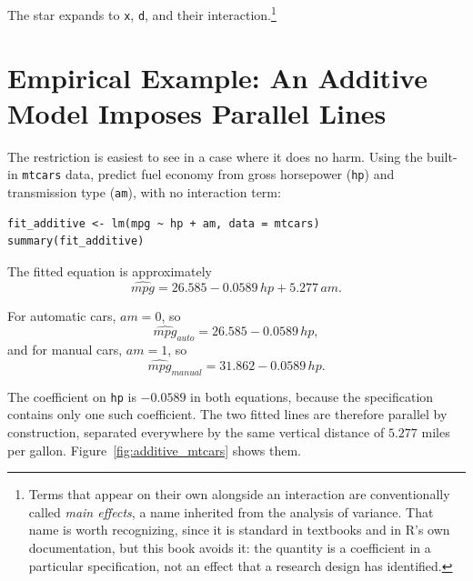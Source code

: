 \documentclass[11pt]{report}
\begin{document}
The star expands to \texttt{x}, \texttt{d}, and their interaction.\footnote{Terms that appear on their own alongside an interaction are conventionally called \emph{main effects}, a name inherited from the analysis of variance. That name is worth recognizing, since it is standard in textbooks and in R's own documentation, but this book avoids it: the quantity is a coefficient in a particular specification, not an effect that a research design has identified.}

\section{Empirical Example: An Additive Model Imposes Parallel Lines}

The restriction is easiest to see in a case where it does no harm. Using the built-in \texttt{mtcars} data, predict fuel economy from gross horsepower (\texttt{hp}) and transmission type (\texttt{am}), with no interaction term:

\begin{lstlisting}
fit_additive <- lm(mpg ~ hp + am, data = mtcars)
summary(fit_additive)
\end{lstlisting}

The fitted equation is approximately
\[
\widehat{mpg}
=
26.585
-0.0589\,hp
+5.277\,am.
\]

For automatic cars, \(am=0\), so
\[
\widehat{mpg}_{auto}
=
26.585-0.0589\,hp,
\]
and for manual cars, \(am=1\), so
\[
\widehat{mpg}_{manual}
=
31.862-0.0589\,hp.
\]

The coefficient on \texttt{hp} is \(-0.0589\) in both equations, because the specification contains only one such coefficient. The two fitted lines are therefore parallel by construction, separated everywhere by the same vertical distance of \(5.277\) miles per gallon. Figure~\ref{fig:additive_mtcars} shows them.
\end{document}
